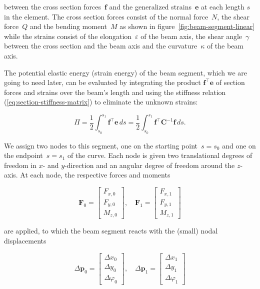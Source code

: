 between the cross section forces~$\boldsymbol{f}$ and the generalized strains~$\boldsymbol{e}$ at each length $s$ in the element.
The cross section forces consist of the normal force~$N$, the shear force~$Q$ and the bending moment~$M$ as shown in figure~\ref{fig:beam-segment-linear} while the strains consist of the elongation~$\varepsilon$ of the beam axis, the shear angle~$\gamma$ between the cross section and the beam axis and the curvature~$\kappa$ of the beam axis.

The potential elastic energy (strain energy) of the beam segment, which we are going to need later, can be evaluated by integrating the product $\boldsymbol{f}^\intercal\boldsymbol{e}$ of section forces and strains over the beam's length and using the stiffness relation (\ref{eq:section-stiffness-matrix}) to eliminate the unknown strains:

\begin{equation}
\Pi = \frac{1}{2}\int_{s_0}^{s_1} \boldsymbol{f}^\intercal\boldsymbol{e}\,ds = \frac{1}{2}\int_{s_0}^{s_1} \boldsymbol{f}^\intercal\boldsymbol{C}^{-1}\boldsymbol{f}\,ds. \label{eq:section-potential-energy}
\end{equation}

We assign two nodes to this segment, one on the starting point~$s = s_0$ and one on the endpoint~$s = s_1$ of the curve.
Each node is given two translational degrees of freedom in $x$- and $y$-direction and an angular degree of freedom around the $z$-axis.
At each node, the respective forces and moments

\begin{equation}
\boldsymbol{F}_{0} = \begin{bmatrix}
F_{x,0} \\ F_{y,0} \\ M_{z,0}
\end{bmatrix},
\quad
\boldsymbol{F}_{1} = \begin{bmatrix}
F_{x,1} \\ F_{y,1} \\ M_{z,1}
\end{bmatrix}
\end{equation}

are applied, to which the beam segment reacts with the (small) nodal displacements

\begin{equation}
\Delta\boldsymbol{p}_{0} = \begin{bmatrix}
\Delta x_0 \\ \Delta y_0 \\ \Delta \varphi_0
\end{bmatrix},
\quad
\Delta\boldsymbol{p}_{1} = \begin{bmatrix}
\Delta x_1 \\ \Delta y_1 \\ \Delta \varphi_1
\end{bmatrix}
\end{equation}

